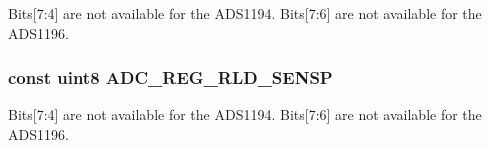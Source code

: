 Bits\mbox{[}7\-:4\mbox{]} are not available for the A\-D\-S1194. Bits\mbox{[}7\-:6\mbox{]} are not available for the A\-D\-S1196. \hypertarget{group___chn_set_ga77bb24429b6cb783858cc6feecbfa12f}{
\subsubsection[{A\-D\-C\-\_\-\-R\-E\-G\-\_\-\-R\-L\-D\-\_\-\-S\-E\-N\-S\-P}]{\setlength{\rightskip}{0pt plus 5cm}const uint8 A\-D\-C\-\_\-\-R\-E\-G\-\_\-\-R\-L\-D\-\_\-\-S\-E\-N\-S\-P}}\label{group___chn_set_ga77bb24429b6cb783858cc6feecbfa12f}
Bits\mbox{[}7\-:4\mbox{]} are not available for the A\-D\-S1194. Bits\mbox{[}7\-:6\mbox{]} are not available for the A\-D\-S1196. 